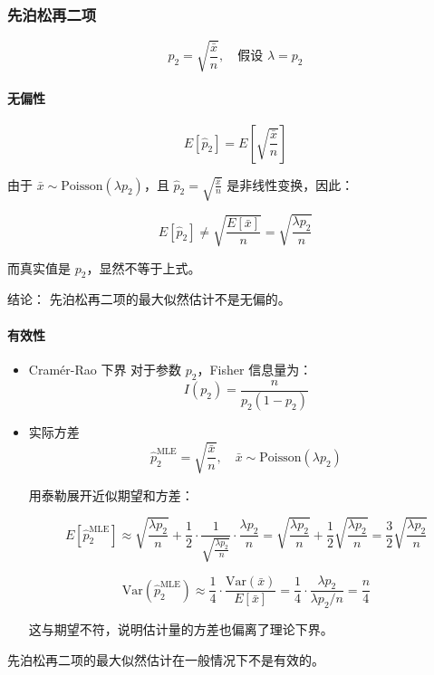 \documentclass{article}
\begin{document}
\subsubsection{先泊松再二项}
$$
\hat{p}_2 = \sqrt{\frac{\bar{x}}{n}}, \quad \text{假设 } \lambda = p_2
$$
\paragraph{无偏性}
$$
E[\hat{p}_2] = E\left[ \sqrt{\frac{\bar{x}}{n}} \right]
$$

由于 $ \bar{x} \sim \text{Poisson}(\lambda p_2) $，且 $ \hat{p}_2 = \sqrt{\frac{\bar{x}}{n}} $ 是非线性变换，因此：

$$
E[\hat{p}_2] \neq \sqrt{ \frac{E[\bar{x}]}{n} } = \sqrt{ \frac{\lambda p_2}{n} }
$$

而真实值是 $ p_2 $，显然不等于上式。

结论：
先泊松再二项的最大似然估计不是无偏的。
\paragraph{有效性}
\begin{itemize}
    \item Cramér-Rao 下界
    对于参数 $ p_2 $，Fisher 信息量为：
$$
I(p_2) = \frac{n}{p_2(1 - p_2)}
$$

    \item 实际方差
    $$
\hat{p}_2^{\text{MLE}} = \sqrt{\frac{\bar{x}}{n}}, \quad \bar{x} \sim \text{Poisson}(\lambda p_2)
$$

用泰勒展开近似期望和方差：

$$
E[\hat{p}_2^{\text{MLE}}] \approx \sqrt{ \frac{\lambda p_2}{n} } + \frac{1}{2} \cdot \frac{1}{\sqrt{ \frac{\lambda p_2}{n} }} \cdot \frac{\lambda p_2}{n}
= \sqrt{ \frac{\lambda p_2}{n} } + \frac{1}{2} \sqrt{ \frac{\lambda p_2}{n} }
= \frac{3}{2} \sqrt{ \frac{\lambda p_2}{n} }
$$

$$
\text{Var}(\hat{p}_2^{\text{MLE}}) \approx \frac{1}{4} \cdot \frac{\text{Var}(\bar{x})}{E[\bar{x}]}
= \frac{1}{4} \cdot \frac{\lambda p_2}{\lambda p_2 / n} = \frac{n}{4}
$$

这与期望不符，说明估计量的方差也偏离了理论下界。
\end{itemize}
先泊松再二项的最大似然估计在一般情况下不是有效的。
\end{document}
